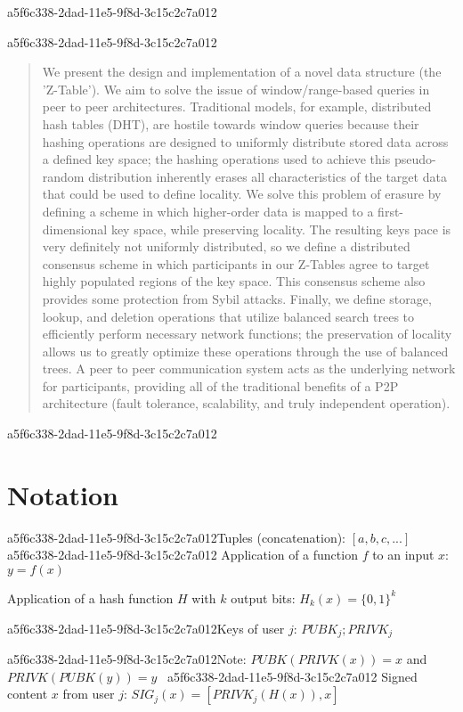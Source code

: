 \documentclass[12pt]{article}
\begin{document}
a5f6c338-2dad-11e5-9f8d-3c15c2c7a012\maketitle
a5f6c338-2dad-11e5-9f8d-3c15c2c7a012
\begin{abstract}
We present the design and implementation of a novel data structure (the 'Z-Table'). We aim to solve the issue of window/range-based queries in peer to peer architectures. Traditional models, for example,  distributed hash tables (DHT), are hostile towards window queries because their hashing operations are designed to uniformly distribute stored data across a defined key space; the hashing operations used to achieve this pseudo-random distribution inherently erases all characteristics of the target data that could be used to define locality. We solve this problem of erasure by defining a scheme in which higher-order data is mapped to a first-dimensional key space, while preserving locality. The resulting keys pace is very definitely not uniformly distributed, so we define a distributed consensus scheme in which participants in our Z-Tables agree to target highly populated regions of the key space. This consensus scheme also provides some protection from Sybil attacks. Finally, we define storage, lookup, and deletion operations that utilize balanced search trees to efficiently perform necessary network functions; the preservation of locality allows us to greatly optimize these operations through the use of balanced trees. A peer to peer communication system acts as the underlying network for participants, providing all of the traditional benefits of a P2P architecture (fault tolerance, scalability, and truly independent operation).
\end{abstract}

a5f6c338-2dad-11e5-9f8d-3c15c2c7a012\section{Notation}

a5f6c338-2dad-11e5-9f8d-3c15c2c7a012Tuples (concatenation): $[a,b,c,...]$
a5f6c338-2dad-11e5-9f8d-3c15c2c7a012
Application of a function $f$ to an input $x$: $y=f(x)$

Application of a hash function $H$ with $k$ output bits: $H_{k}(x) = \{0,1\}^k$

a5f6c338-2dad-11e5-9f8d-3c15c2c7a012Keys of user $j$: $ PUBK_j; PRIVK_j $

a5f6c338-2dad-11e5-9f8d-3c15c2c7a012Note: $PUBK(PRIVK(x)) = x$ and $PRIVK(PUBK(y)) = y$~
a5f6c338-2dad-11e5-9f8d-3c15c2c7a012
Signed content $x$ from user $j$: $SIG_j(x) = \left[ PRIVK_j( H(x) ), x \right]$
\end{document}
